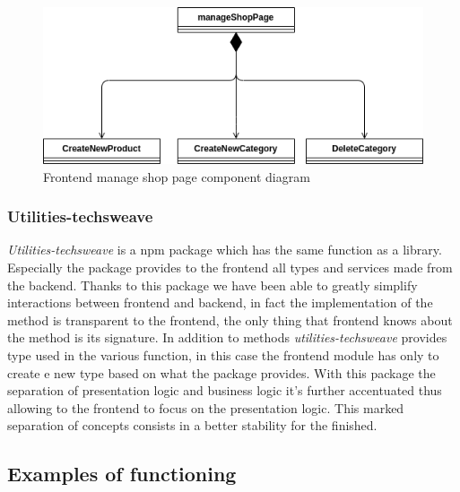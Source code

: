 \begin{figure}[!ht]
  \caption{ Frontend manage shop page component diagram}
  \vspace{10px}
  \includegraphics[scale=0.39]{../../../../Images/Diagrammi/maintainerManual/FE/manageShopDiagram.png}
  \centering
\end{figure}
\clearpage
\subsubsection{Utilities-techsweave}
\textit{Utilities-techsweave} is a npm package which has the same function as a library. Especially the package provides to the frontend all types and services made from the backend. Thanks to this package we have been able to greatly simplify interactions between frontend and backend, in fact the implementation of the method is transparent to the frontend, the only thing that frontend knows about the method is its signature.
In addition to methods \textit{utilities-techsweave} provides type used in the various function, in this case the frontend module has only to create e new type based on what the package provides. With this package the separation of presentation logic and business logic it's further accentuated thus allowing to the frontend to focus on the presentation logic. This marked separation of concepts consists in a better stability for the finished.















\subsection{Examples of functioning}
